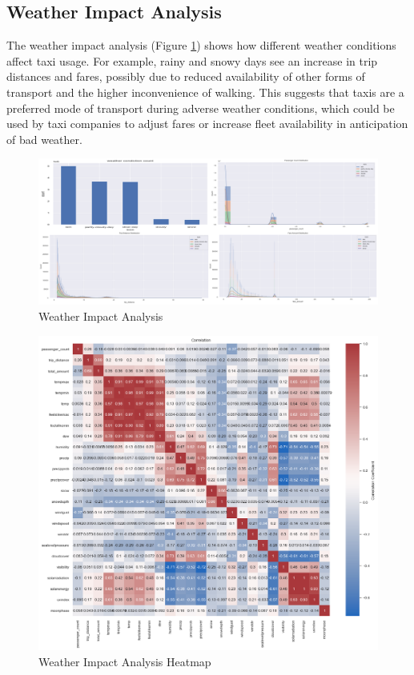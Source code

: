 \documentclass[11pt]{article}
\begin{document}
\subsection{Weather Impact Analysis}
The weather impact analysis (Figure \ref{fig:4}) shows how different weather conditions affect taxi usage. For example, rainy and snowy days see an increase in trip distances and fares, possibly due to reduced availability of other forms of transport and the higher inconvenience of walking. This suggests that taxis are a preferred mode of transport during adverse weather conditions, which could be used by taxi companies to adjust fares or increase fleet availability in anticipation of bad weather. \cite{weatherimpact2020}

\begin{figure}[h]
    \includegraphics[width=1\textwidth]{image/weather.png}
    \centering
    \caption{Weather Impact Analysis} %
    \label{fig:4}
    
\end{figure}


\begin{figure}[h]
    \includegraphics[width=.55\textwidth]{image/Weather Impact heatmap.png}
    \centering
    \caption{Weather Impact Analysis Heatmap} %
    \label{fig:5}
    
\end{figure}
\end{document}

